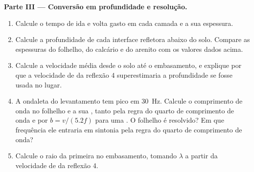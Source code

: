 \begin{problem}
\noindent\textbf{Parte III --- Conversão em profundidade e resolução.}
\begin{enumerate}[resume]
  \item Calcule o tempo de ida e volta gasto em cada camada e a sua espessura.
  \item Calcule a profundidade de cada interface refletora abaixo do solo. Compare
        as espessuras do folhelho, do calcário e do arenito com os valores
        dados acima.
  \item Calcule a velocidade média desde o solo até o embasamento, e explique por que
        a velocidade de  da reflexão 4 superestimaria a profundidade se fosse usada
        no lugar.
  \item A ondaleta do levantamento tem pico em \qty{30}{Hz}. Calcule o comprimento de onda no
        folhelho e a sua , tanto pela regra do quarto de comprimento de onda
        e por $b = v/(5.2f)$ para uma . O folhelho é resolvido? Em
        que frequência ele entraria em sintonia pela regra do quarto de comprimento de onda?
  \item Calcule o raio da primeira  no embasamento, tomando
        $\lambda$ a partir da velocidade de  da reflexão 4.
\end{enumerate}


\end{problem}
